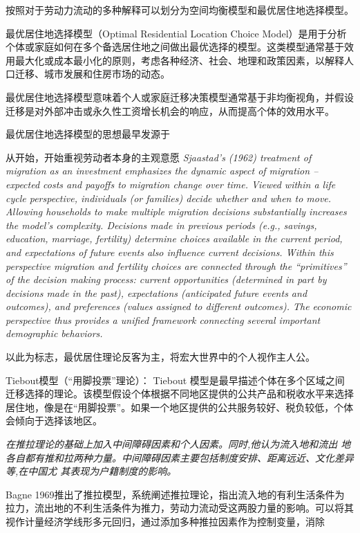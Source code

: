 \documentclass[a4paper,12pt]{article}
\begin{document}
按照\cite{jiaEconomicsInternalMigration2023}对于劳动力流动的多种解释可以划分为空间均衡模型和最优居住地选择模型。

最优居住地选择模型（Optimal Residential Location Choice Model）是用于分析个体或家庭如何在多个备选居住地之间做出最优选择的模型。这类模型通常基于效用最大化或成本最小化的原则，考虑各种经济、社会、地理和政策因素，以解释人口迁移、城市发展和住房市场的动态。

最优居住地选择模型意味着个人或家庭迁移决策模型通常基于非均衡视角，并假设迁移是对外部冲击或永久性工资增长机会的响应，从而提高个体的效用水平。

最优居住地选择模型的思想最早发源于

从\cite{sjaastadCostsReturnsHuman1962}开始，开始重视劳动者本身的主观意愿
\textit{Sjaastad’s (1962) treatment of migration as an investment emphasizes the dynamic  aspect of migration – expected costs and payoffs to migration change over time. Viewed  within a life cycle perspective, individuals (or families) decide whether and when to  move. Allowing households to make multiple migration decisions substantially increases the model’s complexity. Decisions made in previous periods (e.g., savings, education,  marriage, fertility) determine choices available in the current period, and expectations  of future events also influence current decisions. Within this perspective migration and  fertility choices are connected through the “primitives” of the decision making process:  current opportunities (determined in part by decisions made in the past), expectations (anticipated future events and outcomes), and preferences (values assigned to different outcomes). The economic perspective thus provides a unified framework connecting several important demographic behaviors.}

以此为标志，最优居住理论反客为主，将宏大世界中的个人视作主人公。

Tiebout模型（“用脚投票”理论）： Tiebout 模型是最早描述个体在多个区域之间迁移选择的理论。该模型假设个体根据不同地区提供的公共产品和税收水平来选择居住地，像是在“用脚投票”。如果一个地区提供的公共服务较好、税负较低，个体会倾向于选择该地区。

\cite{leeTheoryMigration1966}\textit{在推拉理论的基础上加入中间障碍因素和个人因素。同时,他认为流入地和流出  地各自都有推和拉两种力量。中间障碍因素主要包括制度安排、距离远近、文化差异等,在中国尤  其表现为户籍制度的影响。}

Bagne 1969推出了推拉模型，系统阐述推拉理论，指出流入地的有利生活条件为拉力，流出地的不利生活条件为推力，劳动力流动受这两股力量的影响。可以将其视作计量经济学线形多元回归，通过添加多种推拉因素作为控制变量，消除
\end{document}
